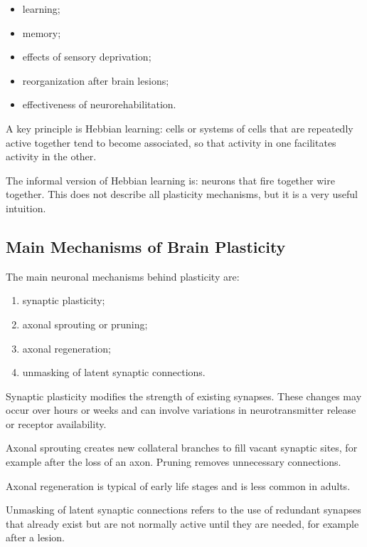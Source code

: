 \begin{itemize}[noitemsep]
    \item learning;
    \item memory;
    \item effects of sensory deprivation;
    \item reorganization after brain lesions;
    \item effectiveness of neurorehabilitation.
\end{itemize}

A key principle is Hebbian learning: cells or systems of cells that are repeatedly active together tend to become associated, so that activity in one facilitates activity in the other.

\begin{authornote}
The informal version of Hebbian learning is: neurons that fire together wire together. This does not describe all plasticity mechanisms, but it is a very useful intuition.
\end{authornote}

\subsection{Main Mechanisms of Brain Plasticity}

The main neuronal mechanisms behind plasticity are:

\begin{enumerate}[noitemsep]
    \item synaptic plasticity;
    \item axonal sprouting or pruning;
    \item axonal regeneration;
    \item unmasking of latent synaptic connections.
\end{enumerate}

Synaptic plasticity modifies the strength of existing synapses. These changes may occur over hours or weeks and can involve variations in neurotransmitter release or receptor availability.

Axonal sprouting creates new collateral branches to fill vacant synaptic sites, for example after the loss of an axon. Pruning removes unnecessary connections.

Axonal regeneration is typical of early life stages and is less common in adults.

Unmasking of latent synaptic connections refers to the use of redundant synapses that already exist but are not normally active until they are needed, for example after a lesion.

